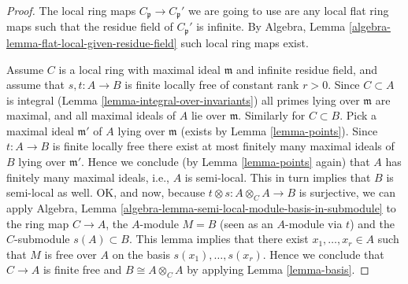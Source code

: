 \documentclass{amsart}
\theoremstyle{plain}
\theoremstyle{definition}
\theoremstyle{remark}
\numberwithin{equation}{subsection}
\begin{document}
\begin{proof}
\medskip\noindent
The local ring maps $C_{\mathfrak p} \to C_{\mathfrak p}'$ we are going
to use are any local flat ring maps such that the residue field of
$C_{\mathfrak p}'$ is infinite.
By Algebra, Lemma \ref{algebra-lemma-flat-local-given-residue-field}
such local ring maps exist.

\medskip\noindent
Assume $C$ is a local ring with maximal ideal $\mathfrak m$ and
infinite residue field, and assume that $s, t : A \to B$ is
finite locally free of constant rank $r > 0$.
Since $C \subset A$ is integral (Lemma \ref{lemma-integral-over-invariants})
all primes lying over $\mathfrak m$ are maximal, and all maximal
ideals of $A$ lie over $\mathfrak m$. Similarly for $C \subset B$.
Pick a maximal ideal $\mathfrak m'$
of $A$ lying over $\mathfrak m$ (exists by Lemma \ref{lemma-points}).
Since $t : A \to B$ is finite locally free there exist at most finitely
many maximal ideals of $B$ lying over $\mathfrak m'$. Hence we conclude
(by Lemma \ref{lemma-points} again)
that $A$ has finitely many maximal ideals, i.e.,
$A$ is semi-local. This in turn implies that $B$ is semi-local as
well. OK, and now, because $t \otimes s : A \otimes_C A \to B$ is surjective,
we can apply
Algebra, Lemma \ref{algebra-lemma-semi-local-module-basis-in-submodule}
to the ring map $C \to A$, the $A$-module $M = B$ (seen as an $A$-module
via $t$) and the $C$-submodule $s(A) \subset B$. This lemma implies that there
exist $x_1, \ldots, x_r \in A$ such that $M$ is free over $A$
on the basis $s(x_1), \ldots, s(x_r)$. Hence we conclude that $C \to A$
is finite free and $B \cong A \otimes_C A$ by applying
Lemma \ref{lemma-basis}.
\end{proof}
\end{document}
